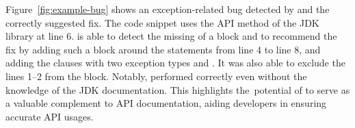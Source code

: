 Figure~\ref{fig:example-bug} shows an exception-related bug detected
by {\tool} and the correctly suggested fix. The code snippet uses the
API method  of the JDK library at line 6. {\tool} is
able to detect the missing of a  block and to
recommend the fix by adding such a block around the statements from
line 4 to line 8, and adding the  clauses with two
exception types  and
. It was also able to exclude the lines
1--2 from the  block. Notably, {\tool} performed correctly
even without the knowledge of the JDK documentation.  This highlights
the~potential of {\tool} to serve as a valuable complement to API
documentation, aiding developers in ensuring accurate API usages.




%


